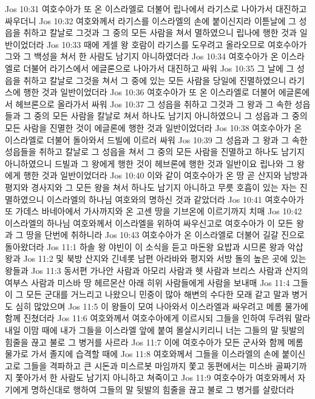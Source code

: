 Jos 10:31  여호수아가 또 온 이스라엘로 더불어 립나에서 라기스로 나아가서 대진하고 싸우더니
Jos 10:32  여호와께서 라기스를 이스라엘의 손에 붙이신지라 이튿날에 그 성읍을 취하고 칼날로 그것과 그 중의 모든 사람을 쳐서 멸하였으니 립나에 행한 것과 일반이었더라
Jos 10:33  때에 게셀 왕 호람이 라기스를 도우려고 올라오므로 여호수아가 그와 그 백성을 쳐서 한 사람도 남기지 아니하였더라
Jos 10:34  여호수아가 온 이스라엘로 더불어 라기스에서 에글론으로 나아가서 대진하고 싸워
Jos 10:35  그 날에 그 성읍을 취하고 칼날로 그것을 쳐서 그 중에 있는 모든 사람을 당일에 진멸하였으니 라기스에 행한 것과 일반이었더라
Jos 10:36  여호수아가 또 온 이스라엘로 더불어 에글론에서 헤브론으로 올라가서 싸워
Jos 10:37  그 성읍을 취하고 그것과 그 왕과 그 속한 성읍들과 그 중의 모든 사람을 칼날로 쳐서 하나도 남기지 아니하였으니 그 성읍과 그 중의 모든 사람을 진멸한 것이 에글론에 행한 것과 일반이었더라
Jos 10:38  여호수아가 온 이스라엘로 더불어 돌아와서 드빌에 이르러 싸워
Jos 10:39  그 성읍과 그 왕과 그 속한 성읍들을 취하고 칼날로 그 성읍을 쳐서 그 중의 모든 사람을 진멸하고 하나도 남기지 아니하였으니 드빌과 그 왕에게 행한 것이 헤브론에 행한 것과 일반이요 립나와 그 왕에게 행한 것과 일반이었더라
Jos 10:40  이와 같이 여호수아가 온 땅 곧 산지와 남방과 평지와 경사지와 그 모든 왕을 쳐서 하나도 남기지 아니하고 무릇 호흡이 있는 자는 진멸하였으니 이스라엘의 하나님 여호와의 명하신 것과 같았더라
Jos 10:41  여호수아가 또 가데스 바네아에서 가사까지와 온 고센 땅을 기브온에 이르기까지 치매
Jos 10:42  이스라엘의 하나님 여호와께서 이스라엘을 위하여 싸우신고로 여호수아가 이 모든 왕과 그 땅을 단번에 취하니라
Jos 10:43  여호수아가 온 이스라엘로 더불어 길갈 진으로 돌아왔더라
Jos 11:1  하솔 왕 야빈이 이 소식을 듣고 마돈왕 요밥과 시므론 왕과 악삽 왕과
Jos 11:2  및 북방 산지와 긴네롯 남편 아라바와 평지와 서방 돌의 높은 곳에 있는 왕들과
Jos 11:3  동서편 가나안 사람과 아모리 사람과 헷 사람과 브리스 사람과 산지의 여부스 사람과 미스바 땅 헤르몬산 아래 히위 사람들에게 사람을 보내매
Jos 11:4  그들이 그 모든 군대를 거느리고 나왔으니 민중이 많아 해변의 수다한 모래 같고 말과 병거도 심히 많았으며
Jos 11:5  이 왕들이 모여 나아와서 이스라엘과 싸우려고 메롬 물가에 함께 진쳤더라
Jos 11:6  여호와께서 여호수아에게 이르시되 그들을 인하여 두려워 말라 내일 이맘 때에 내가 그들을 이스라엘 앞에 붙여 몰살시키리니 너는 그들의 말 뒷발의 힘줄을 끊고 불로 그 병거를 사르라
Jos 11:7  이에 여호수아가 모든 군사와 함께 메롬 물가로 가서 졸지에 습격할 때에
Jos 11:8  여호와께서 그들을 이스라엘의 손에 붙이신 고로 그들을 격파하고 큰 시돈과 미스르봇 마임까지 쫓고 동편에서는 미스바 골짜기까지 쫓아가서 한 사람도 남기지 아니하고 쳐죽이고
Jos 11:9  여호수아가 여호와께서 자기에게 명하신대로 행하여 그들의 말 뒷발의 힘줄을 끊고 불로 그 병거를 살랐더라
